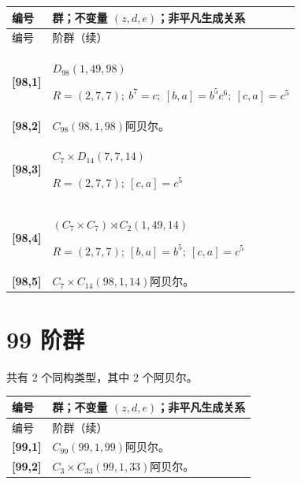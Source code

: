 \documentclass[UTF8,fontset=fandol,11pt,a4paper]{ctexart}
\begin{document}
\begingroup\small\setlength{\tabcolsep}{3pt}\renewcommand{\arraystretch}{1.12}

\begin{longtable}{@{}p{17mm}>{\raggedright\arraybackslash}p{141mm}@{}}

\toprule 编号 & 群；不变量 $(z,d,e)$；非平凡生成关系\\\midrule\endfirsthead

\toprule 编号 & 98 阶群（续）\\\midrule\endhead\bottomrule\endfoot

\textbf{[98,1]} & $D_{98}$\quad $(1,49,98)$\par\(R=(2,7,7);\allowbreak\ b^{7}=c;\allowbreak\ [b,a]=b^{5}c^{6};\allowbreak\ [c,a]=c^{5}\)\\[3pt]

\textbf{[98,2]} & $C_{98}$\quad $(98,1,98)$\quad 阿贝尔。\\[3pt]

\textbf{[98,3]} & $C_{7}\times D_{14}$\quad $(7,7,14)$\par\(R=(2,7,7);\allowbreak\ [c,a]=c^{5}\)\\[3pt]

\textbf{[98,4]} & $(C_{7}\times C_{7})\rtimes C_{2}$\quad $(1,49,14)$\par\(R=(2,7,7);\allowbreak\ [b,a]=b^{5};\allowbreak\ [c,a]=c^{5}\)\\[3pt]

\textbf{[98,5]} & $C_{7}\times C_{14}$\quad $(98,1,14)$\quad 阿贝尔。\\[3pt]

\end{longtable}\endgroup

\section*{99 阶群}\label{order:99}

共有 $2$ 个同构类型，其中 $2$ 个阿贝尔。

\begingroup\small\setlength{\tabcolsep}{3pt}\renewcommand{\arraystretch}{1.12}

\begin{longtable}{@{}p{17mm}>{\raggedright\arraybackslash}p{141mm}@{}}

\toprule 编号 & 群；不变量 $(z,d,e)$；非平凡生成关系\\\midrule\endfirsthead

\toprule 编号 & 99 阶群（续）\\\midrule\endhead\bottomrule\endfoot

\textbf{[99,1]} & $C_{99}$\quad $(99,1,99)$\quad 阿贝尔。\\[3pt]

\textbf{[99,2]} & $C_{3}\times C_{33}$\quad $(99,1,33)$\quad 阿贝尔。\\[3pt]

\end{longtable}\endgroup
\end{document}
